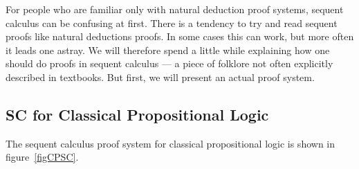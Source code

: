 For people who are familiar only with natural deduction proof systems,
sequent calculus can be confusing at first.  There is a tendency to
try and read sequent proofs like natural deductions proofs.  In some
cases this can work, but more often it leads one astray.  We will
therefore spend a little while explaining how one should do proofs in
sequent calculus --- a piece of folklore not often explicitly
described in textbooks.  But first, we will present an actual proof
system.

\subsection{SC for Classical Propositional Logic}
The sequent calculus proof system for classical propositional logic is
shown in figure~\ref{figCPSC}.
\begin{figure}
\begin{center}
\end{center}
\end{figure}
